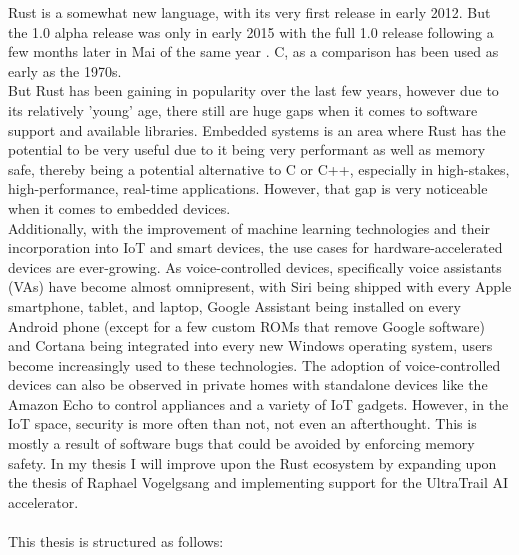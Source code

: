 
Rust \cite{rustlang} is a somewhat new language, with its very first release in early 2012.
But the 1.0 alpha release was only in early 2015 with the full 1.0 release following a few
months later in Mai of the same year \cite{rust_releases}.
C, as a comparison has been used as early as the 1970s.\\
But Rust has been gaining in popularity \cite{rust_popularity} over the last few years, however
due to its relatively 'young' age, there still are huge gaps when it comes to software support and available libraries.
Embedded systems is an area where Rust has the potential to be very useful due to it being very performant as well as memory safe,
thereby being a potential alternative to C or C++, especially in high-stakes, high-performance, real-time applications.
However, that gap is very noticeable when it comes to embedded devices.\\
Additionally, with the improvement of machine learning technologies and their incorporation into IoT and smart devices,
the use cases for hardware-accelerated devices are ever-growing.
As voice-controlled devices, specifically voice assistants (VAs) have become almost omnipresent,
with Siri being shipped with every Apple smartphone, tablet, and laptop, Google Assistant being installed
on every Android phone (except for a few custom ROMs that remove Google software) and Cortana being integrated
into every new Windows operating system, users become increasingly used to these technologies.
The adoption of voice-controlled devices can also be observed in private homes with standalone
devices like the Amazon Echo to control appliances and a variety of IoT gadgets.
However, in the IoT space, security is more often than not, not even an afterthought.
This is mostly a result of software bugs that could be avoided by enforcing memory safety.
In my thesis I will improve upon the Rust ecosystem by expanding upon the thesis of Raphael Vogelgsang \cite{rust_pulp}
and implementing support for the UltraTrail \cite{ultratrail} AI accelerator.
\\\\
This thesis is structured as follows:
